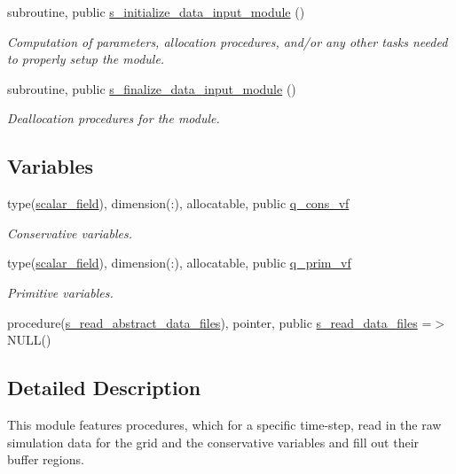\begin{DoxyCompactItemize}
subroutine, public \hyperlink{namespacem__data__input_a806c2edb19d6a47fd494f8491d2b93d3}{s\+\_\+initialize\+\_\+data\+\_\+input\+\_\+module} ()
\begin{DoxyCompactList}\small\item\em Computation of parameters, allocation procedures, and/or any other tasks needed to properly setup the module. \end{DoxyCompactList}\item 
subroutine, public \hyperlink{namespacem__data__input_aa29d4a799cd1c1cd7d0f05f05f42abe0}{s\+\_\+finalize\+\_\+data\+\_\+input\+\_\+module} ()
\begin{DoxyCompactList}\small\item\em Deallocation procedures for the module. \end{DoxyCompactList}\end{DoxyCompactItemize}
\subsection*{Variables}
\begin{DoxyCompactItemize}
\item 
type(\hyperlink{structm__derived__types_1_1scalar__field}{scalar\+\_\+field}), dimension(\+:), allocatable, public \hyperlink{namespacem__data__input_a464b144d544f769a0d9a1b549c510e1f}{q\+\_\+cons\+\_\+vf}
\begin{DoxyCompactList}\small\item\em Conservative variables. \end{DoxyCompactList}\item 
type(\hyperlink{structm__derived__types_1_1scalar__field}{scalar\+\_\+field}), dimension(\+:), allocatable, public \hyperlink{namespacem__data__input_a65ba499d27d4b21b1ec8bcfe02816bd4}{q\+\_\+prim\+\_\+vf}
\begin{DoxyCompactList}\small\item\em Primitive variables. \end{DoxyCompactList}\item 
procedure(\hyperlink{interfacem__data__input_1_1s__read__abstract__data__files}{s\+\_\+read\+\_\+abstract\+\_\+data\+\_\+files}), pointer, public \hyperlink{namespacem__data__input_aba1cbfb151ed869483feb37291104830}{s\+\_\+read\+\_\+data\+\_\+files} =$>$ N\+U\+LL()
\end{DoxyCompactItemize}


\subsection{Detailed Description}
This module features procedures, which for a specific time-\/step, read in the raw simulation data for the grid and the conservative variables and fill out their buffer regions. 

